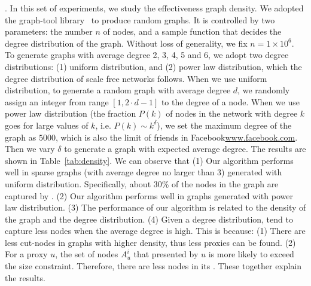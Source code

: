 .
In this set of experiments, we study the effectiveness \wrt graph density. We adopted the graph-tool library~\cite{peixoto_graph-tool_2014} to produce random graphs. It is controlled by two parameters: the number $n$ of nodes, and a sample function that decides the degree distribution of the graph. Without loss of generality, we fix $n=1\times 10^6$. To generate graphs with average degree 2, 3, 4, 5 and 6, we adopt two degree distributions: (1) uniform distribution, and (2) power law distribution, which the degree distribution of scale free networks follows. When we use uniform distribution, to generate a random graph with average degree $d$, we randomly assign an integer from range $[1, 2\cdot d-1]$ to the degree of a node. When we use power law distribution (the fraction $P(k)$ of nodes in the network with degree $k$ goes for large values of $k$, i.e. $P(k)\sim k^\delta$), we set the maximum degree of the graph as $5000$, which is also the limit of friends in Facebook\url{www.facebook.com}. Then we vary $\delta$ to generate a graph with expected average degree. The results are shown in Table~\ref{tab:density}. We can observe that (1) Our algorithm performs well in sparse graphs (with average degree no larger than 3) generated with uniform distribution. Specifically, about 30\% of the nodes in the graph are captured by \dras. (2) Our algorithm performs well in graphs generated with power law distribution. (3) The performance of our algorithm is related to the density of the graph and the degree distribution. (4) Given a degree distribution, \dras tend to capture less nodes when the average degree is high. This is because: (1) There are less cut-nodes in graphs with higher density, thus less proxies can be found. (2) For a proxy $u$, the set of nodes $A_u^i$ that presented by $u$ is more likely to exceed the size constraint. Therefore, there are less nodes in its \dra. These together explain the results.


